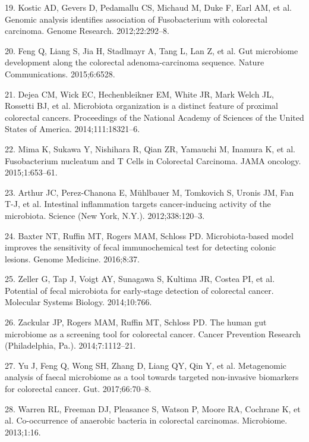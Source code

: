 \documentclass[12pt,]{article}
\begin{document}
\hypertarget{ref-kostic_genomic_2012}{}
19. Kostic AD, Gevers D, Pedamallu CS, Michaud M, Duke F, Earl AM, et
al. Genomic analysis identifies association of Fusobacterium with
colorectal carcinoma. Genome Research. 2012;22:292--8.

\hypertarget{ref-feng_gut_2015}{}
20. Feng Q, Liang S, Jia H, Stadlmayr A, Tang L, Lan Z, et al. Gut
microbiome development along the colorectal adenoma-carcinoma sequence.
Nature Communications. 2015;6:6528.

\hypertarget{ref-dejea_microbiota_2014}{}
21. Dejea CM, Wick EC, Hechenbleikner EM, White JR, Mark Welch JL,
Rossetti BJ, et al. Microbiota organization is a distinct feature of
proximal colorectal cancers. Proceedings of the National Academy of
Sciences of the United States of America. 2014;111:18321--6.

\hypertarget{ref-mima_fusobacterium_2015}{}
22. Mima K, Sukawa Y, Nishihara R, Qian ZR, Yamauchi M, Inamura K, et
al. Fusobacterium nucleatum and T Cells in Colorectal Carcinoma. JAMA
oncology. 2015;1:653--61.

\hypertarget{ref-arthur_intestinal_2012}{}
23. Arthur JC, Perez-Chanona E, Mühlbauer M, Tomkovich S, Uronis JM, Fan
T-J, et al. Intestinal inflammation targets cancer-inducing activity of
the microbiota. Science (New York, N.Y.). 2012;338:120--3.

\hypertarget{ref-baxter_microbiota-based_2016}{}
24. Baxter NT, Ruffin MT, Rogers MAM, Schloss PD. Microbiota-based model
improves the sensitivity of fecal immunochemical test for detecting
colonic lesions. Genome Medicine. 2016;8:37.

\hypertarget{ref-zeller_potential_2014}{}
25. Zeller G, Tap J, Voigt AY, Sunagawa S, Kultima JR, Costea PI, et al.
Potential of fecal microbiota for early-stage detection of colorectal
cancer. Molecular Systems Biology. 2014;10:766.

\hypertarget{ref-zackular_human_2014}{}
26. Zackular JP, Rogers MAM, Ruffin MT, Schloss PD. The human gut
microbiome as a screening tool for colorectal cancer. Cancer Prevention
Research (Philadelphia, Pa.). 2014;7:1112--21.

\hypertarget{ref-yu_metagenomic_2017}{}
27. Yu J, Feng Q, Wong SH, Zhang D, Liang QY, Qin Y, et al. Metagenomic
analysis of faecal microbiome as a tool towards targeted non-invasive
biomarkers for colorectal cancer. Gut. 2017;66:70--8.

\hypertarget{ref-warren_co-occurrence_2013}{}
28. Warren RL, Freeman DJ, Pleasance S, Watson P, Moore RA, Cochrane K,
et al. Co-occurrence of anaerobic bacteria in colorectal carcinomas.
Microbiome. 2013;1:16.
\end{document}
